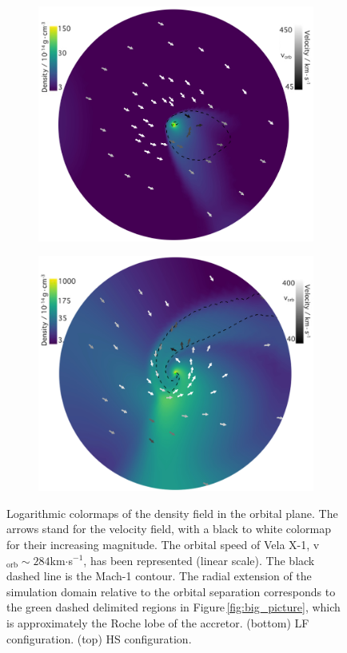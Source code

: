 \documentclass{aa}
\begin{document}
\begin{figure}
\begin{subfigure}{.5\textwidth}
\centering
\includegraphics[width=0.99\columnwidth]{Pictures/LF_adiab.jpeg}
  \label{fig:sfig1}
\end{subfigure}
\begin{subfigure}{.5\textwidth}
\centering
\includegraphics[width=0.99\columnwidth]{Pictures/HS_adiab.jpeg}
  \label{fig:sfig2}
\end{subfigure}
\caption{Logarithmic colormaps of the density field in the orbital plane. The arrows stand for the velocity field, with a black to white colormap for their increasing magnitude. The orbital speed of Vela X-1, v$_{\text{orb}}\sim284$km$\cdot$s$^{-1}$, has been represented (linear scale). The black dashed line is the Mach-1 contour. The radial extension of the simulation domain relative to the orbital separation corresponds to the green dashed delimited regions in Figure\,\ref{fig:big_picture}, which is approximately the Roche lobe of the accretor. (bottom) LF configuration. (top) HS configuration.}
\label{fig:adiab}
\end{figure} 
\end{document}
